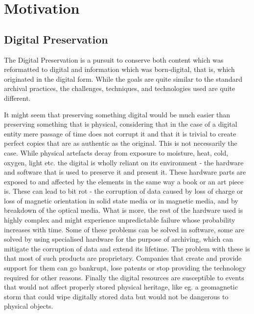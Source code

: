 \clearpage %

\section{Motivation}

\subsection{Digital Preservation}

The Digital Preservation is a pursuit to conserve both content which was
reformatted to digital and information which was born-digital, that is, which
originated in the digital form. While the goals are quite similar to the
standard archival practices, the challenges, techniques, and technologies used
are quite different.

It might seem that preserving something digital would be much easier than
preserving something that is physical, considering that in the case of
a digital entity mere passage of time does not corrupt it and that it is
trivial to create perfect copies that are as authentic as the original. This is
not necessarily the case. While physical artefacts decay from exposure to
moisture, heat, cold, oxygen, light etc. the digital is wholly reliant on its
environment - the hardware and software that is used to preserve it and present
it. These hardware parts are exposed to and affected by the elements in the
same way a book or an art piece is. These can lead to bit rot - the corruption
of data caused by loss of charge or loss of magnetic orientation in solid state
media or in magnetic media, and by breakdown of the optical media. What is
more, the rest of the hardware used is highly complex and might experience
unpredictable failure whose probability increases with time. Some of these
problems can be solved in software, some are solved by using specialised
hardware for the purpose of archiving, which can mitigate the corruption of
data and extend its lifetime. The problem with these is that most of such
products are proprietary. Companies that create and provide support for them
can go bankrupt, lose patents or stop providing the technology required for
other reasons. Finally the digital resources are susceptible to events that
would not affect properly stored physical heritage, like eg. a geomagnetic
storm that could wipe digitally stored data but would not be dangerous to
physical objects.

